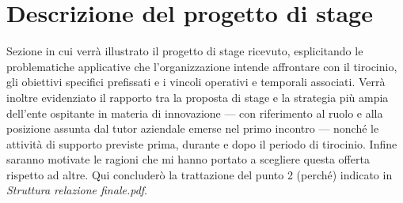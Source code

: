 \section{Descrizione del progetto di stage}

Sezione in cui verrà illustrato il progetto di stage ricevuto, esplicitando le problematiche applicative che l'organizzazione intende affrontare con il tirocinio, gli obiettivi specifici prefissati e i vincoli operativi e temporali associati. Verrà inoltre evidenziato il rapporto tra la proposta di stage e la strategia più ampia dell'ente ospitante in materia di innovazione — con riferimento al ruolo e alla posizione assunta dal tutor aziendale emerse nel primo incontro — nonché le attività di supporto previste prima, durante e dopo il periodo di tirocinio. Infine saranno motivate le ragioni che mi hanno portato a scegliere questa offerta rispetto ad altre.  
Qui concluderò la trattazione del punto 2 (perché) indicato in \textit{Struttura relazione finale.pdf}.